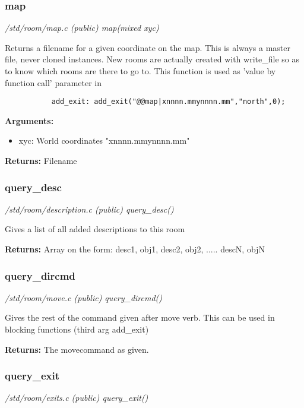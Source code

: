 \subsubsection{map}

{\em /std/room/map.c (public) map(mixed xyc)}

Returns a filename for a given coordinate on the map.
This is always a master file, never cloned instances.
New rooms are actually created with write\_file so as to
know which rooms are there to go to.
This function is used as 'value by function call' parameter in

\begin{verbatim}
           add_exit: add_exit("@@map|xnnnn.mmynnnn.mm","north",0);
\end{verbatim}

{\bf Arguments:}
\begin{itemize}
\item        xyc: World coordinates "xnnnn.mmynnnn.mm"
\end{itemize}

{\bf Returns:}          Filename


\subsubsection{query\_desc}

{\em /std/room/description.c (public) query\_desc()}

Gives a list of all added descriptions to this room

{\bf Returns:}          Array on the form:
desc1, obj1, desc2, obj2, ..... descN, objN


\subsubsection{query\_dircmd}

{\em /std/room/move.c (public) query\_dircmd()}

Gives the rest of the command given after move verb.
This can be used in blocking functions (third arg add\_exit)

{\bf Returns:}        The movecommand as given. 


\subsubsection{query\_exit}

{\em /std/room/exits.c (public) query\_exit()}

